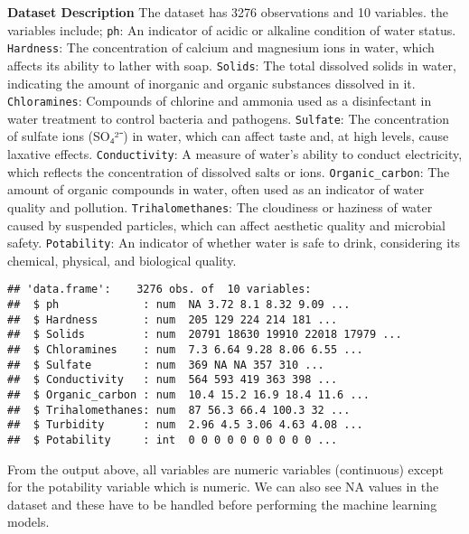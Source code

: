 \documentclass[
]{article}
\begin{document}
\textbf{Dataset Description} The dataset has 3276 observations and 10
variables. the variables include; \texttt{ph}: An indicator of acidic or
alkaline condition of water status. \texttt{Hardness}: The concentration
of calcium and magnesium ions in water, which affects its ability to
lather with soap. \texttt{Solids}: The total dissolved solids in water,
indicating the amount of inorganic and organic substances dissolved in
it. \texttt{Chloramines}: Compounds of chlorine and ammonia used as a
disinfectant in water treatment to control bacteria and pathogens.
\texttt{Sulfate}: The concentration of sulfate ions (SO₄²⁻) in water,
which can affect taste and, at high levels, cause laxative effects.
\texttt{Conductivity}: A measure of water's ability to conduct
electricity, which reflects the concentration of dissolved salts or
ions. \texttt{Organic\_carbon}: The amount of organic compounds in
water, often used as an indicator of water quality and pollution.
\texttt{Trihalomethanes}: The cloudiness or haziness of water caused by
suspended particles, which can affect aesthetic quality and microbial
safety. \texttt{Potability}: An indicator of whether water is safe to
drink, considering its chemical, physical, and biological quality.

\begin{verbatim}
## 'data.frame':    3276 obs. of  10 variables:
##  $ ph             : num  NA 3.72 8.1 8.32 9.09 ...
##  $ Hardness       : num  205 129 224 214 181 ...
##  $ Solids         : num  20791 18630 19910 22018 17979 ...
##  $ Chloramines    : num  7.3 6.64 9.28 8.06 6.55 ...
##  $ Sulfate        : num  369 NA NA 357 310 ...
##  $ Conductivity   : num  564 593 419 363 398 ...
##  $ Organic_carbon : num  10.4 15.2 16.9 18.4 11.6 ...
##  $ Trihalomethanes: num  87 56.3 66.4 100.3 32 ...
##  $ Turbidity      : num  2.96 4.5 3.06 4.63 4.08 ...
##  $ Potability     : int  0 0 0 0 0 0 0 0 0 0 ...
\end{verbatim}

From the output above, all variables are numeric variables (continuous)
except for the potability variable which is numeric. We can also see NA
values in the dataset and these have to be handled before performing the
machine learning models.
\end{document}
